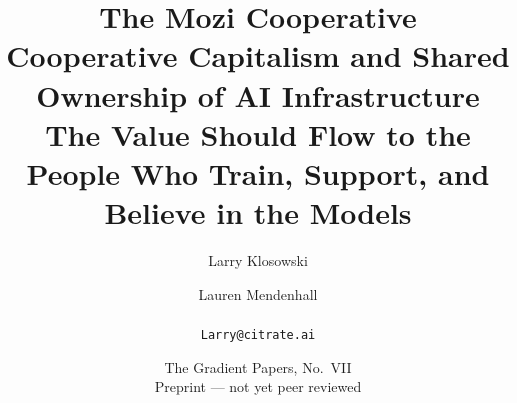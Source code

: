 
\title{\textbf{The Mozi Cooperative}\\[3pt]
\large Cooperative Capitalism and Shared Ownership of AI Infrastructure\\[2pt]
\normalsize The Value Should Flow to the People Who Train, Support, and Believe in the Models}
\author{Larry Klosowski \and Lauren Mendenhall\\[2pt]\CitrateAffil\\ \texttt{Larry@citrate.ai}}
\date{The Gradient Papers, No.~VII \\ Preprint --- not yet peer reviewed}
\maketitle

